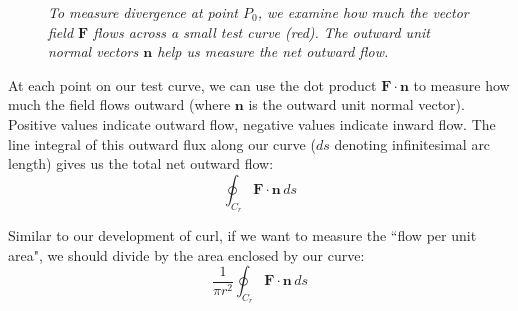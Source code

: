 \begin{figure}[H]
\centering
{}
\caption{\textit{To measure divergence at point $P_0$, we examine how much the vector field $\mathbf{F}$ flows across a small test curve (red). The outward unit normal vectors $\mathbf{n}$ help us measure the net outward flow.}}
\label{fig:divergence_probe}
\end{figure}


\noindent At each point on our test curve, we can use the dot product $\mathbf{F} \cdot \mathbf{n}$ to measure how much the field flows outward (where $\mathbf{n}$ is the outward unit normal vector). Positive values indicate outward flow, negative values indicate inward flow. The line integral of this outward flux along our curve ($ds$ denoting infinitesimal arc length) gives us the total net outward flow:
\[
\oint_{C_r} \mathbf{F} \cdot \mathbf{n}\,ds
\]

\noindent Similar to our development of curl, if we want to measure the ``flow per unit area", we should divide by the area enclosed by our curve:
\[
\frac{1}{\pi r^2} \oint_{C_r} \mathbf{F} \cdot \mathbf{n}\,ds
\]

